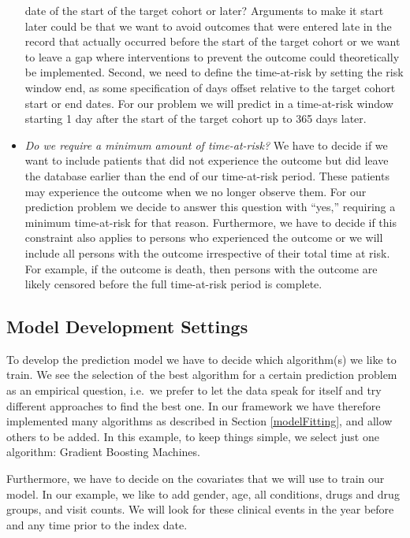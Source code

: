 \documentclass[11pt]{book}
\theoremstyle{definition}
\theoremstyle{definition}
\theoremstyle{definition}
\theoremstyle{remark}
\begin{document}
\begin{itemize}
  date of the start of the target cohort or later? Arguments to make it
  start later could be that we want to avoid outcomes that were entered
  late in the record that actually occurred before the start of the
  target cohort or we want to leave a gap where interventions to prevent
  the outcome could theoretically be implemented. Second, we need to
  define the time-at-risk by setting the risk window end, as some
  specification of days offset relative to the target cohort start or
  end dates. For our problem we will predict in a time-at-risk window
  starting 1 day after the start of the target cohort up to 365 days
  later.
\item
  \emph{Do we require a minimum amount of time-at-risk?} We have to
  decide if we want to include patients that did not experience the
  outcome but did leave the database earlier than the end of our
  time-at-risk period. These patients may experience the outcome when we
  no longer observe them. For our prediction problem we decide to answer
  this question with ``yes,'' requiring a minimum time-at-risk for that
  reason. Furthermore, we have to decide if this constraint also applies
  to persons who experienced the outcome or we will include all persons
  with the outcome irrespective of their total time at risk. For
  example, if the outcome is death, then persons with the outcome are
  likely censored before the full time-at-risk period is complete.
\end{itemize}

\subsection{Model Development
Settings}\label{model-development-settings}

To develop the prediction model we have to decide which algorithm(s) we
like to train. We see the selection of the best algorithm for a certain
prediction problem as an empirical question, i.e.~we prefer to let the
data speak for itself and try different approaches to find the best one.
In our framework we have therefore implemented many algorithms as
described in Section \ref{modelFitting}, and allow others to be added.
In this example, to keep things simple, we select just one algorithm:
Gradient Boosting Machines.

Furthermore, we have to decide on the covariates that we will use to
train our model. In our example, we like to add gender, age, all
conditions, drugs and drug groups, and visit counts. We will look for
these clinical events in the year before and any time prior to the index
date.
\end{document}
